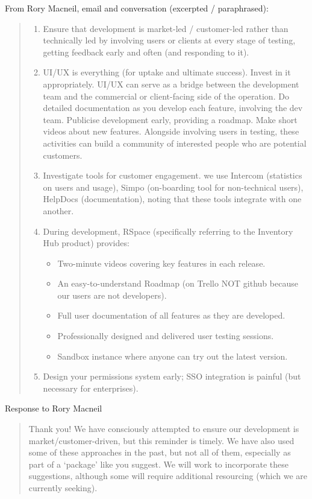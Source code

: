 \documentclass[a4paper,headings=small fontsize=10pt]{scrreprt}
\begin{document}
From Rory Macneil, email and conversation (excerpted / paraphrased):
\begin{quote}
\begin{enumerate}[itemsep=1em]

\item Ensure that development is market-led / customer-led rather than technically led by 
   involving users or clients at every stage of testing, getting feedback early and often 
   (and responding to it). 
   
\item UI/UX is everything (for uptake and ultimate success). Invest in it appropriately. UI/UX can serve as a bridge 
   between the development team and the commercial or client-facing side of the operation.
   Do detailed documentation as you develop each feature, involving the dev team. Publicise
   development early, providing a roadmap. Make short videos about new features. 
   Alongside involving users in testing, these activities
   can build a community of interested people who are potential customers. 
   
\item Investigate tools for customer engagement. we use Intercom (statistics on users and usage),
   Simpo (on-boarding tool for non-technical users), HelpDocs (documentation), noting that these tools 
   integrate with one another.
   
\item During development, RSpace (specifically referring to the Inventory Hub product) provides:
   \begin{itemize}
     \item Two-minute videos covering key features in each release.
     \item An easy-to-understand Roadmap (on Trello NOT github because our users are not developers).
     \item Full user documentation of all features as they are developed.
     \item Professionally designed and delivered user testing sessions.
     \item Sandbox instance where anyone can try out the latest version.
   \end{itemize}
\item Design your permissions system early; SSO integration is painful (but necessary for enterprises).

\end{enumerate}
\end{quote}

Response to Rory Macneil

\begin{quote}
Thank you! We have consciously attempted to ensure our development is market/customer-driven, 
but this reminder is timely. We have also used some of these approaches in the past, but 
not all of them, especially as part of a `package' like you suggest. We will work to 
incorporate these suggestions, although some will require additional resourcing 
(which we are currently seeking).
\end{quote}   
\end{document}
